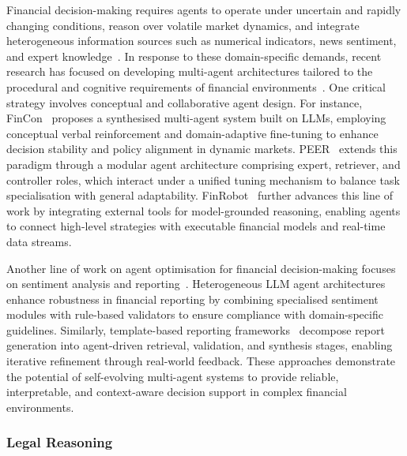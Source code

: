 \documentclass[]{selfevolagent}
\theoremstyle{plain}
\theoremstyle{definition}
\theoremstyle{remark}
\begin{document}
Financial decision-making requires agents to operate under uncertain and rapidly changing conditions, reason over volatile market dynamics, and integrate heterogeneous information sources such as numerical indicators, news sentiment, and expert knowledge~\citep{li2023tradinggpt,sarin2024unleashing,chudziak2025elliottagents}. In response to these domain-specific demands, recent research has focused on developing multi-agent architectures tailored to the procedural and cognitive requirements of financial environments~\citep{fatemi2024finvision,luo2025llm}. One critical strategy involves conceptual and collaborative agent design. For instance, FinCon~\citep{yu2024fincon} proposes a synthesised multi-agent system built on LLMs, employing conceptual verbal reinforcement and domain-adaptive fine-tuning to enhance decision stability and policy alignment in dynamic markets. PEER~\citep{wang2024peer} extends this paradigm through a modular agent architecture comprising expert, retriever, and controller roles, which interact under a unified tuning mechanism to balance task specialisation with general adaptability. FinRobot~\citep{yang2024finrobot} further advances this line of work by integrating external tools for model-grounded reasoning, enabling agents to connect high-level strategies with executable financial models and real-time data streams.

Another line of work on agent optimisation for financial decision-making focuses on sentiment analysis and reporting~\citep{xing2024designing,tian2025template,raza2025trism}. Heterogeneous LLM agent architectures~\citep{xing2024designing} enhance robustness in financial reporting by combining specialised sentiment modules with rule-based validators to ensure compliance with domain-specific guidelines. Similarly, template-based reporting frameworks~\citep{tian2025template} decompose report generation into agent-driven retrieval, validation, and synthesis stages, enabling iterative refinement through real-world feedback. These approaches demonstrate the potential of self-evolving multi-agent systems to provide reliable, interpretable, and context-aware decision support in complex financial environments.


\subsubsection{Legal Reasoning}
\end{document}
